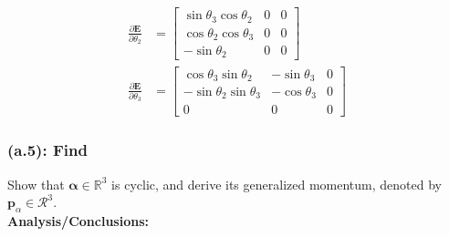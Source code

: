 \documentclass[titlepage]{article}
\begin{document}
\begin{mdframed}[linewidth=1pt, innertopmargin=10pt, innerbottommargin=10pt]
\begin{equation}
\begin{split}
			\frac{\partial\boldsymbol{E}}{\partial\theta_2}&=
			\begin{bmatrix}
				\sin\theta_3\cos\theta_2 & 0 & 0 \\
				\cos\theta_2\cos\theta_3 & 0 & 0 \\
				-\sin\theta_2 & 0 & 0
			\end{bmatrix} \\[6pt]
			\frac{\partial\boldsymbol{E}}{\partial\theta_3}&=
			\begin{bmatrix}
				\cos\theta_3\sin\theta_2 & -\sin\theta_3 & 0 \\
				-\sin\theta_2\sin\theta_3 & -\cos\theta_3 & 0 \\
				0 & 0 & 0
			\end{bmatrix}
		\end{split}
		\label{eq:EOMS}
	\end{equation}
	\endgroup
\end{mdframed}

\newpage

\subsubsection*{(a.5): Find}

Show that $\boldsymbol{\alpha}\in\mathbb{R}^3$ is cyclic, and derive its generalized momentum, denoted by $\boldsymbol{p}_\alpha\in\mathcal{R}^3$.\\

\textbf{Analysis/Conclusions:}\\
\end{document}
